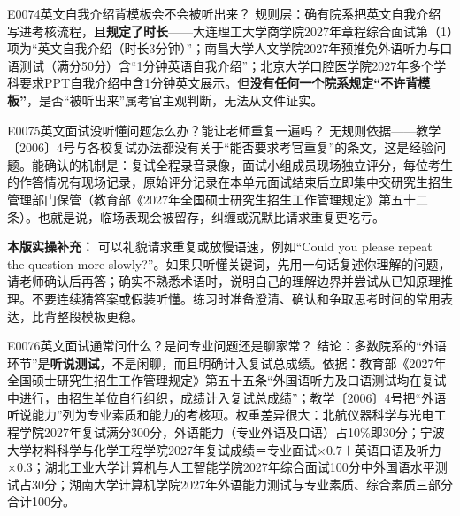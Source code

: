 \begin{qa}{E0074}{英文自我介绍背模板会不会被听出来？}
规则层：确有院系把英文自我介绍写进考核流程，且\textbf{规定了时长}——大连理工大学商学院2027年章程综合面试第（1）项为“英文自我介绍（时长3分钟）”；南昌大学人文学院2027年预推免外语听力与口语测试（满分50分）含“1分钟英语自我介绍”；北京大学口腔医学院2027年多个学科要求PPT自我介绍中含1分钟英文展示。但\textbf{没有任何一个院系规定“不许背模板”}，是否“被听出来”属考官主观判断，无法从文件证实。
\end{qa}

\begin{qa}{E0075}{英文面试没听懂问题怎么办？能让老师重复一遍吗？}
无规则依据——教学〔2006〕4号与各校复试办法都没有关于“能否要求考官重复”的条文，这是经验问题。能确认的机制是：复试全程录音录像，面试小组成员现场独立评分，每位考生的作答情况有现场记录，原始评分记录在本单元面试结束后立即集中交研究生招生管理部门保管（教育部《2027年全国硕士研究生招生工作管理规定》第五十二条）。也就是说，临场表现会被留存，纠缠或沉默比请求重复更吃亏。
\par\textbf{本版实操补充：} 可以礼貌请求重复或放慢语速，例如“Could you please repeat the question more slowly?”。如果只听懂关键词，先用一句话复述你理解的问题，请老师确认后再答；确实不熟悉术语时，说明自己的理解边界并尝试从已知原理推理。不要连续猜答案或假装听懂。练习时准备澄清、确认和争取思考时间的常用表达，比背整段模板更稳。
\end{qa}

\begin{qa}{E0076}{英文面试通常问什么？是问专业问题还是聊家常？}
结论：多数院系的“外语环节”是\textbf{听说测试}，不是闲聊，而且明确计入复试总成绩。依据：教育部《2027年全国硕士研究生招生工作管理规定》第五十五条“外国语听力及口语测试均在复试中进行，由招生单位自行组织，成绩计入复试总成绩”；教学〔2006〕4号把“外语听说能力”列为专业素质和能力的考核项。权重差异很大：北航仪器科学与光电工程学院2027年复试满分300分，外语能力（专业外语及口语）占10\%即30分；宁波大学材料科学与化学工程学院2027年复试成绩＝专业面试×0.7＋英语口语及听力×0.3；湖北工业大学计算机与人工智能学院2027年综合面试100分中外国语水平测试占30分；湖南大学计算机学院2027年外语能力测试与专业素质、综合素质三部分合计100分。
\end{qa}

